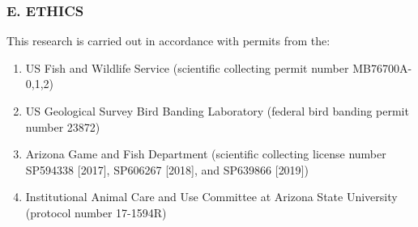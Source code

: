 \documentclass[]{article}
\newenvironment{Shaded}{\begin{snugshade}}{\end{snugshade}}
\newcommand{\KeywordTok}[1]{\textcolor[rgb]{0.13,0.29,0.53}{\textbf{#1}}}
\newcommand{\DataTypeTok}[1]{\textcolor[rgb]{0.13,0.29,0.53}{#1}}
\newcommand{\StringTok}[1]{\textcolor[rgb]{0.31,0.60,0.02}{#1}}
\newcommand{\CommentTok}[1]{\textcolor[rgb]{0.56,0.35,0.01}{\textit{#1}}}
\newcommand{\OperatorTok}[1]{\textcolor[rgb]{0.81,0.36,0.00}{\textbf{#1}}}
\newcommand{\ErrorTok}[1]{\textcolor[rgb]{0.64,0.00,0.00}{\textbf{#1}}}
\newcommand{\NormalTok}[1]{#1}
\providecommand{\tightlist}{%
  \setlength{\itemsep}{0pt}\setlength{\parskip}{0pt}}
\begin{document}
\begin{Shaded}
\end{Shaded}

\subsubsection{E. ETHICS}\label{e.-ethics}

This research is carried out in accordance with permits from the:

\begin{enumerate}
\def\labelenumi{\arabic{enumi})}
\tightlist
\item
  US Fish and Wildlife Service (scientific collecting permit number
  MB76700A-0,1,2)
\item
  US Geological Survey Bird Banding Laboratory (federal bird banding
  permit number 23872)
\item
  Arizona Game and Fish Department (scientific collecting license number
  SP594338 {[}2017{]}, SP606267 {[}2018{]}, and SP639866 {[}2019{]})
\item
  Institutional Animal Care and Use Committee at Arizona State
  University (protocol number 17-1594R)
\end{enumerate}
\end{document}
